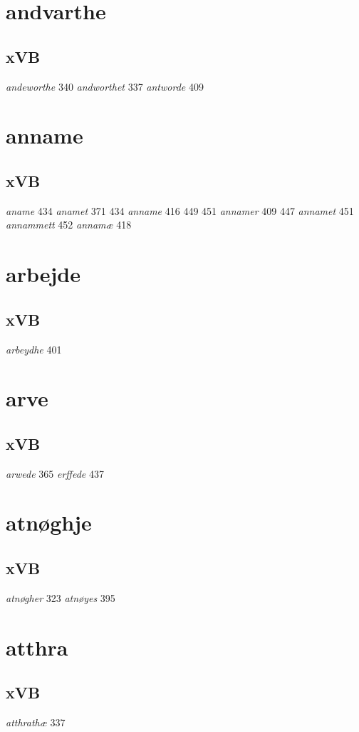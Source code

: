 \documentclass[a4paper,twocolumn]{article}
\begin{document}
\section{andvarthe}
\label{sec:orgb556c4f}
\subsection{xVB}
\label{sec:org5fdc9b1}
\emph{andeworthe} 340 \emph{andworthet} 337 \emph{antworde} 409 
\section{anname}
\label{sec:org58ed70e}
\subsection{xVB}
\label{sec:org4b47b45}
\emph{aname} 434 \emph{anamet} 371 434 \emph{anname} 416 449 451 \emph{annamer} 409 447 \emph{annamet} 451 \emph{annammett} 452 \emph{annamæ} 418 
\section{arbejde}
\label{sec:org1fbd6a0}
\subsection{xVB}
\label{sec:org8ddecaf}
\emph{arbeydhe} 401 
\section{arve}
\label{sec:org404a33a}
\subsection{xVB}
\label{sec:org44ef249}
\emph{arwede} 365 \emph{erffede} 437 
\section{atnøghje}
\label{sec:org5043a2c}
\subsection{xVB}
\label{sec:org7aa5978}
\emph{atnøgher} 323 \emph{atnøyes} 395 
\section{atthra}
\label{sec:org3c20da8}
\subsection{xVB}
\label{sec:org2fb61ec}
\emph{atthrathæ} 337 
\end{document}
